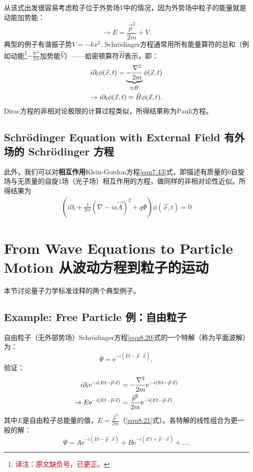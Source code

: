 从该式出发很容易考虑粒子位于外势场$V$中的情况，因为外势场中粒子的能量就是动能加势能：
\[
	\to E = \frac{\vec{p}^2}{2m} + V.
\]
典型的例子有谐振子势$V = -k x^2$. Schrödinger方程通常用所有能量算符的总和（例如动能\footnote{\textcolor{red}{译注：原文缺负号，已更正。}}$-\frac{\nabla^2}{2m}$加势能$\hat{V}$）——蛤密顿算符$\hat{H}$表示，即：
\begin{align}
	i \partial_t \phi(\vec{x}, t) = \underbrace{-\frac{\nabla^2}{2m} }_{\equiv \hat{H}} \phi(\vec{x}, t) \notag \\
\label{equ8.22}
	\to i \partial_t \phi(\vec{x}, t) = \hat{H} \phi(\vec{x}, t).
\end{align}
Dirac方程的非相对论极限的计算过程类似，所得结果称为Pauli方程。



\subsection[有外场的 Schr\"{o}dinger 方程]{Schr\"{o}dinger Equation with External Field 有外场的 Schr\"{o}dinger 方程}\label{sec8.4.1}

此外，我们可以对{\bf 相互作用}Klein-Gordon方程\eqref{equ7.43}式，即描述有质量的$0$自旋场与无质量的自旋$1$场（光子场）相互作用的方程，做同样的非相对论性近似。所得结果为
\begin{align}
\label{equ8.23}
	\left(i\partial_t+\frac{1}{2m}\left(\nabla-ia\vec{A}\right)^2+q\Phi\right)\phi(\vec{x},t)=0
\end{align}

\section[从波动方程到粒子的运动]{From Wave Equations to Particle Motion \quad 从波动方程到粒子的运动}\label{sec8.5}
本节讨论量子力学标准诠释的两个典型例子。

\subsection[例：自由粒子]{Example: Free Particle \quad 例：自由粒子}\label{sec8.5.1}
自由粒子（无外部势场）Schrödinger方程\eqref{equ8.20}式的一个特解（称为平面波解）为：
\begin{equation}
\label{equ8.24}
	\Psi = \mathrm{e}^{-i (Et - \vec{p} \cdot \vec{x})},
\end{equation}
验证：
\begin{align}
	i \partial_t \mathrm{e}^{-i (Et - \vec{p} \cdot \vec{x}) } &= -\frac{\nabla^2}{2m} \mathrm{e}^{-i (Et - \vec{p} \cdot \vec{x}) } \notag \\
\label{equ8.25}
	\to E \mathrm{e}^{-i(Et - \vec{p} \cdot \vec{x}) } &= \frac{\vec{p}^2}{2m} \mathrm{e}^{-i(Et - \vec{p} \cdot \vec{x}) }.
\end{align}
其中$E$是自由粒子总能量的值，$E = \frac{\vec{p}^2}{2m}$（\eqref{equ8.21}式）。各特解的线性组合为更一般的解：
\[ \Psi = A \mathrm{e}^{-i(Et - \vec{p} \cdot \vec{x}) } + B \mathrm{e}^{-i (E' t + \vec{p}' \cdot \vec{x}) } + \dots . \]

